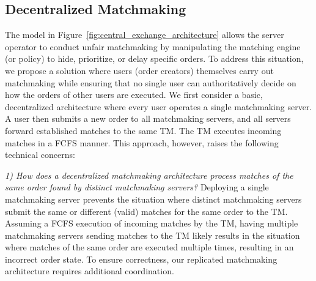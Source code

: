 

\subsection{Decentralized Matchmaking}
\label{sec:towards_fair_reliable_matchmaking}
The model in Figure~\ref{fig:central_exchange_architecture} allows the server operator to conduct unfair matchmaking by manipulating the matching engine (or policy) to hide, prioritize, or delay specific orders.
To address this situation, we propose a solution where users (order creators) themselves carry out matchmaking while ensuring that no single user can authoritatively decide on how the orders of other users are executed.
We first consider a basic, decentralized architecture where every user operates a single matchmaking server.
A user then submits a new order to all matchmaking servers, and all servers forward established matches to the same TM.
The TM executes incoming matches in a FCFS manner.
This approach, however, raises the following technical concerns:

\emph{1) How does a decentralized matchmaking architecture process matches of the same order found by distinct matchmaking servers?}
Deploying a single matchmaking server prevents the situation where distinct matchmaking servers submit the same or different (valid) matches for the same order to the TM.
Assuming a FCFS execution of incoming matches by the TM, having multiple matchmaking servers sending matches to the TM likely results in the situation where matches of the same order are executed multiple times, resulting in an incorrect order state.
To ensure correctness, our replicated matchmaking architecture requires additional coordination. %

